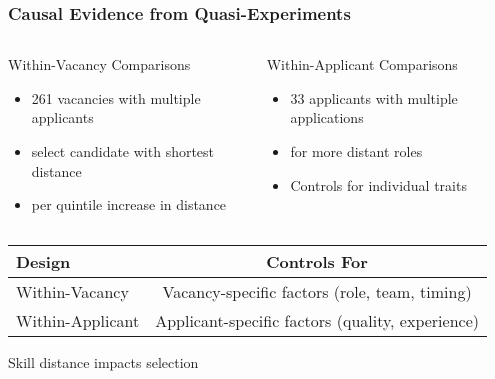 \documentclass[aspectratio=169]{beamer}
\begin{document}
\begin{frame}
\frametitle{Causal Evidence from Quasi-Experiments}

\begin{columns}
\begin{column}{0.48\textwidth}
\begin{block}{Within-Vacancy Comparisons}
\begin{itemize}
\item 261 vacancies with multiple applicants
\item {} select candidate with shortest distance
\item {} per quintile increase in distance
\end{itemize}
\end{block}
\end{column}

\begin{column}{0.48\textwidth}
\begin{block}{Within-Applicant Comparisons}
\begin{itemize}
\item 33 applicants with multiple applications
\item {} for more distant roles
\item Controls for individual traits
\end{itemize}
\end{block}
\end{column}
\end{columns}
\vspace{1em}

\begin{center}
\begin{tabular}{|l|c|}
\hline
\textbf{Design} & \textbf{Controls For} \\
\hline
Within-Vacancy & Vacancy-specific factors (role, team, timing) \\
Within-Applicant & Applicant-specific factors (quality, experience) \\
\hline
\end{tabular}
\end{center}

\begin{center}
Skill distance  impacts selection
\end{center}
\end{frame}
\end{document}

